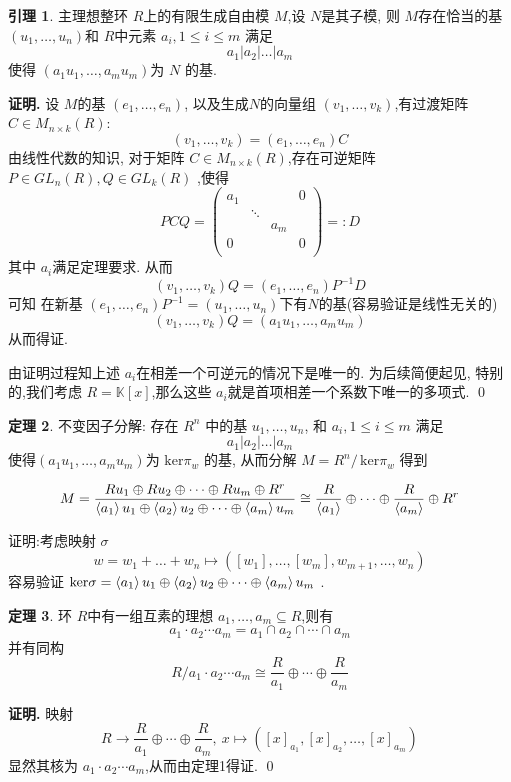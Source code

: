 \documentclass[12pt, a4paper,oneside, UTF8]{ctexart}
\theoremstyle{definition}
\newtheorem{lemma}{\indent 引理}    %
\newtheorem{thm}[lemma]{\indent 定理}
\theoremstyle{plain}
\renewenvironment{proof}{\par\textbf{证明.}\;}{\qed\par} %
\begin{document}
\begin{lemma}
    主理想整环 $R$上的有限生成自由模 $M$,设 $N$是其子模, 则 $M$存在恰当的基 $(u_1, \ldots ,u_{n})$和 $R$中元素 $a_{i}, 1\leq i\leq m$ 满足
    $$a_{1}|a_{2}|\dots|a_{m}$$ 使得 $(a_1u_1, \ldots ,a_{m}u_{m})$为 $N$ 的基.
\end{lemma}
\begin{proof}
    设 $M$的基 $(e_1, \ldots ,e_{n})$, 以及生成$N$的向量组 $(v_1, \ldots ,v_{k})$,有过渡矩阵 $C\in  M_{n\times k}(R) $:
    \[
    (v_1, \ldots ,v_{k}) = (e_1, \ldots ,e_{n})C
    \]
    由线性代数的知识, 对于矩阵 $C\in M_{n\times k}(R)$,存在可逆矩阵 $P \in GL_{n}(R), Q \in GL_{k}(R)$ ,使得
    \[
    PCQ = \begin{pmatrix} a_1  &  &  &0  \\  & \ddots &  &  \\  &  & a_{m} &  \\ 0 &  &  & 0 \\\end{pmatrix} =:D
    \]
    其中 $a_{i}$满足定理要求. 从而$$(v_1, \ldots ,v_{k})Q =(e_1, \ldots ,e_{n})P^{-1} D$$
    可知 在新基 $(e_1, \ldots ,e_{n})P^{-1} =(u_1, \ldots ,u_{n})$下有$N$的基(容易验证是线性无关的) $$(v_1, \ldots ,v_{k})Q = (a_1u_1, \ldots ,a_{m}u_{m})$$ 从而得证.

    由证明过程知上述 $a_{i}$在相差一个可逆元的情况下是唯一的. 为后续简便起见, 特别的,我们考虑 $R = \mathbb{K}[x]$,那么这些 $a_{i}$就是首项相差一个系数下唯一的多项式.
\end{proof}
\begin{thm}
    不变因子分解:  存在 $R^{n}$ 中的基 $u_{1},\dots,u_{n}$, 和 $a_{i}, 1\leq i\leq m$ 满足
 $$a_{1}|a_{2}|\dots|a_{m}$$ 使得$(a_1u_1, \ldots ,a_{m}u_{m})$为 $\mathrm{ker}\pi _{w}$ 的基, 从而分解 $M = R^{n} / \,\mathrm{ker}\pi _{w}$ 得到

$$M = \frac{Ru_{1}\oplus Ru_{2}\oplus \dots \oplus Ru_{m}\oplus R^{r}}{\braket{ a_{1}} u_{1}\oplus \braket{ a_{2}} u_{2}\oplus \dots \oplus \braket{ a_{m}} u_{m}}\cong \frac{R}{\braket{ a_{1}}} \oplus \dots \oplus \frac{R}{\braket{ a_{m}} }\oplus R^{r}$$


证明:考虑映射 $\sigma$
$$w = w_{1}+\dots+w_{n} \mapsto ([w_{1}], \dots,[w_{m}], w_{m+1},\dots,w_{n})$$
容易验证 $\mathrm{ker}\sigma= \braket{ a_{1}} u_{1}\oplus \braket{ a_{2}} u_{2}\oplus \dots \oplus \braket{ a_{m}} u_{m}$ .


\end{thm}


\begin{thm}
    环 $R$中有一组互素的理想 $a_1, \ldots ,a_{m} \subseteq R$,则有
    \[
    a_1\cdot a_2 \cdots a_{m} = a_1 \cap a_2\cap \cdots\cap a_{m}
    \]
    并有同构
    \[
    R / a_1\cdot a_2\cdots a_{m} \cong \frac{R}{a_1} \oplus \cdots \oplus  \frac{R}{a_{m}}
    \]
\end{thm}
\begin{proof}
    映射 
    \[
    R \to \frac{R}{a_1} \oplus \cdots \oplus  \frac{R}{a_{m}} , \ x \mapsto ([x]_{a_1},[x]_{a_2}, \ldots ,[x]_{a_{m}})
    \]
    显然其核为 $ a_1\cdot a_2\cdots a_{m}$,从而由定理1得证.
\end{proof}
\end{document}
